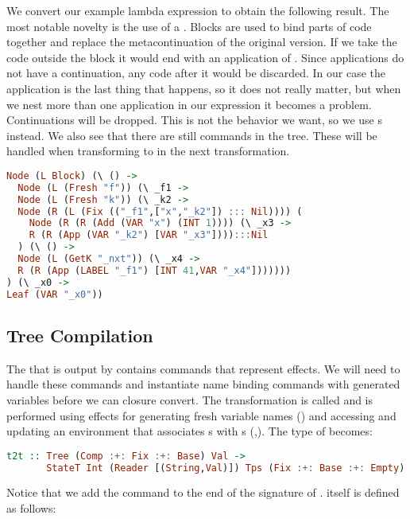 We convert our example lambda expression  to obtain the following result. The most notable novelty is the use of a . Blocks are used to bind parts of code together and replace the metacontinuation of the original version. If we take the code outside the block it would end with an application of . Since applications do not have a continuation, any code after it would be discarded. In our case the application is the last thing that happens, so it does not really matter, but when we nest more than one application in our expression it becomes a problem. Continuations will be dropped. This is not the behavior we want, so we use s instead. We also see that there are still  commands in the tree. These will be handled when transforming to  in the next transformation.

\begin{lstlisting}[language=Haskell]
Node (L Block) (\ () -> 
  Node (L (Fresh "f")) (\ _f1 ->
  Node (L (Fresh "k")) (\ _k2 ->
  Node (R (L (Fix (("_f1",["x","_k2"]) ::: Nil)))) (
    Node (R (R (Add (VAR "x") (INT 1)))) (\ _x3 ->
    R (R (App (VAR "_k2") [VAR "_x3"]))):::Nil
  ) (\ () ->
  Node (L (GetK "_nxt")) (\ _x4 ->
  R (R (App (LABEL "_f1") [INT 41,VAR "_x4"]))))))
) (\ _x0 ->
Leaf (VAR "_x0"))
\end{lstlisting}

\subsection{\label{subsection:semtosyn}Tree Compilation}
The  that is output by  contains commands that represent effects. We will need to handle these commands and instantiate name binding commands with generated variables before we can closure convert. The transformation is called  and is performed using effects for generating fresh variable names () and accessing and updating an environment that associates s with s (,). The type of  becomes:

\begin{lstlisting}[language=Haskell]
t2t :: Tree (Comp :+: Fix :+: Base) Val ->
       StateT Int (Reader [(String,Val)]) Tps (Fix :+: Base :+: Empty) Val
\end{lstlisting}

Notice that we add the  command to the end of the signature of .  itself is defined as follows:


